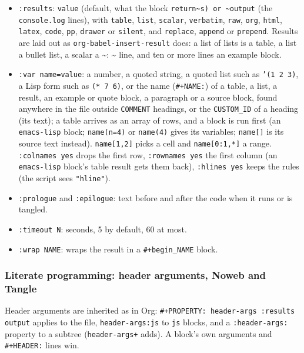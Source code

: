 \documentclass[11pt]{article}
\begin{document}
\begin{itemize}
\item \texttt{:results}: \texttt{value} (default, what the block \texttt{return\textasciitilde{}s) or \textasciitilde{}output} (the \texttt{console.log} lines), with \texttt{table}, \texttt{list}, \texttt{scalar}, \texttt{verbatim}, \texttt{raw}, \texttt{org}, \texttt{html}, \texttt{latex}, \texttt{code}, \texttt{pp}, \texttt{drawer} or \texttt{silent}, and \texttt{replace}, \texttt{append} or \texttt{prepend}. Results are laid out as \texttt{org-babel-insert-result} does: a list of lists is a table, a list a bullet list, a scalar a \textasciitilde{}: \textasciitilde{} line, and ten or more lines an example block.
\item \texttt{:var name=value}: a number, a quoted string, a quoted list such as \texttt{'(1 2 3)}, a Lisp form such as \texttt{(* 7 6)}, or the name (\texttt{\#+NAME:}) of a table, a list, a result, an example or quote block, a paragraph or a source block, found anywhere in the file outside \texttt{COMMENT} headings, or the \texttt{CUSTOM\_ID} of a heading (its text); a table arrives as an array of rows, and a block is run first (an \texttt{emacs-lisp} block; \texttt{name(n=4)} or \texttt{name(4)} gives its variables; \texttt{name[]} is its source text instead). \texttt{name[1,2]} picks a cell and \texttt{name[0:1,*]} a range. \texttt{:colnames yes} drops the first row, \texttt{:rownames yes} the first column (an \texttt{emacs-lisp} block's table result gets them back), \texttt{:hlines yes} keeps the rules (the script sees \texttt{"hline"}).
\item \texttt{:prologue} and \texttt{:epilogue}: text before and after the code when it runs or is tangled.
\item \texttt{:timeout N}: seconds, 5 by default, 60 at most.
\item \texttt{:wrap NAME}: wraps the result in a \texttt{\#+begin\_NAME} block.
\end{itemize}

\subsubsection{Literate programming: header arguments, Noweb and Tangle}
\label{sec:org7b4b28a}
Header arguments are inherited as in Org: \texttt{\#+PROPERTY: header-args :results output} applies to the file, \texttt{header-args:js} to \texttt{js} blocks, and a \texttt{:header-args:} property to a subtree (\texttt{header-args+} adds). A block's own arguments and \texttt{\#+HEADER:} lines win.
\end{document}
